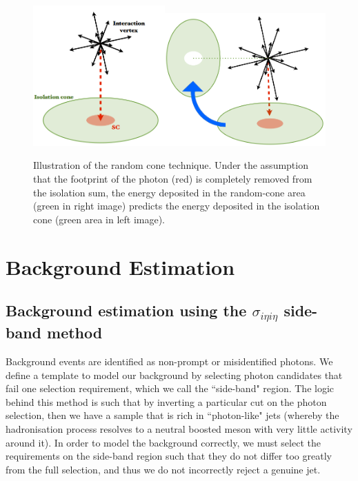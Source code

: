 \begin{figure} \label{fig-RandomConeIsolation}
\begin{center}
\includegraphics[width=0.45\textwidth]{Figures/RandomCone1.png}\includegraphics[width=0.55\textwidth]{Figures/RandomCone2.png}
\caption{Illustration of the random cone technique. Under the assumption that the footprint of the photon (red) is completely removed from the isolation sum, the energy deposited in the random-cone area (green in right image) predicts the energy deposited in the isolation cone (green area in left image). \cite{MarcoThesis}}
\end{center}
\end{figure}

\section{Background Estimation}

\subsection{Background estimation using the $\sigma_{i \eta i \eta}$ side-band method}

Background events are identified as non-prompt or misidentified photons. We define a template to model our background by selecting photon candidates that fail one selection requirement, which we call the ``side-band" region. The logic behind this method is such that by inverting a particular cut on the photon selection, then we have a sample that is rich in ``photon-like" jets (whereby the hadronisation process resolves to a neutral boosted meson with very little activity around it). In order to model the background correctly, we must select the requirements on the side-band region such that they do not differ too greatly from the full selection, and thus we do not incorrectly reject a genuine jet. 

